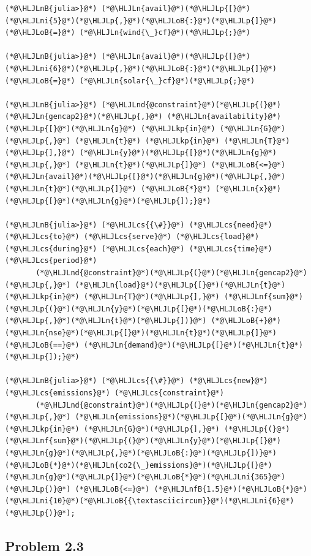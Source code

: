 \documentclass[12pt,a4paper]{article}
\newcommand{\HLJLkp}[1]{\textcolor[RGB]{148,91,176}{\textbf{#1}}}
\newcommand{\HLJLn}[1]{#1}
\newcommand{\HLJLnd}[1]{\textcolor[RGB]{214,102,97}{#1}}
\newcommand{\HLJLnf}[1]{\textcolor[RGB]{66,102,213}{#1}}
\newcommand{\HLJLnB}[1]{\textcolor[RGB]{59,151,46}{#1}}
\newcommand{\HLJLnfB}[1]{\textcolor[RGB]{59,151,46}{#1}}
\newcommand{\HLJLni}[1]{\textcolor[RGB]{59,151,46}{#1}}
\newcommand{\HLJLoB}[1]{\textcolor[RGB]{102,102,102}{\textbf{#1}}}
\newcommand{\HLJLp}[1]{#1}
\newcommand{\HLJLcs}[1]{\textcolor[RGB]{153,153,119}{\textit{#1}}}
\begin{document}
\begin{lstlisting}
(*@\HLJLnB{julia>}@*) (*@\HLJLn{avail}@*)(*@\HLJLp{[}@*)(*@\HLJLni{5}@*)(*@\HLJLp{,}@*)(*@\HLJLoB{:}@*)(*@\HLJLp{]}@*) (*@\HLJLoB{=}@*) (*@\HLJLn{wind{\_}cf}@*)(*@\HLJLp{;}@*)

(*@\HLJLnB{julia>}@*) (*@\HLJLn{avail}@*)(*@\HLJLp{[}@*)(*@\HLJLni{6}@*)(*@\HLJLp{,}@*)(*@\HLJLoB{:}@*)(*@\HLJLp{]}@*) (*@\HLJLoB{=}@*) (*@\HLJLn{solar{\_}cf}@*)(*@\HLJLp{;}@*)

(*@\HLJLnB{julia>}@*) (*@\HLJLnd{@constraint}@*)(*@\HLJLp{(}@*)(*@\HLJLn{gencap2}@*)(*@\HLJLp{,}@*) (*@\HLJLn{availability}@*)(*@\HLJLp{[}@*)(*@\HLJLn{g}@*) (*@\HLJLkp{in}@*) (*@\HLJLn{G}@*)(*@\HLJLp{,}@*) (*@\HLJLn{t}@*) (*@\HLJLkp{in}@*) (*@\HLJLn{T}@*)(*@\HLJLp{],}@*) (*@\HLJLn{y}@*)(*@\HLJLp{[}@*)(*@\HLJLn{g}@*)(*@\HLJLp{,}@*) (*@\HLJLn{t}@*)(*@\HLJLp{]}@*) (*@\HLJLoB{<=}@*) (*@\HLJLn{avail}@*)(*@\HLJLp{[}@*)(*@\HLJLn{g}@*)(*@\HLJLp{,}@*) (*@\HLJLn{t}@*)(*@\HLJLp{]}@*) (*@\HLJLoB{*}@*) (*@\HLJLn{x}@*)(*@\HLJLp{[}@*)(*@\HLJLn{g}@*)(*@\HLJLp{]);}@*)

(*@\HLJLnB{julia>}@*) (*@\HLJLcs{{\#}}@*) (*@\HLJLcs{need}@*) (*@\HLJLcs{to}@*) (*@\HLJLcs{serve}@*) (*@\HLJLcs{load}@*) (*@\HLJLcs{during}@*) (*@\HLJLcs{each}@*) (*@\HLJLcs{time}@*) (*@\HLJLcs{period}@*)
       (*@\HLJLnd{@constraint}@*)(*@\HLJLp{(}@*)(*@\HLJLn{gencap2}@*)(*@\HLJLp{,}@*) (*@\HLJLn{load}@*)(*@\HLJLp{[}@*)(*@\HLJLn{t}@*) (*@\HLJLkp{in}@*) (*@\HLJLn{T}@*)(*@\HLJLp{],}@*) (*@\HLJLnf{sum}@*)(*@\HLJLp{(}@*)(*@\HLJLn{y}@*)(*@\HLJLp{[}@*)(*@\HLJLoB{:}@*)(*@\HLJLp{,}@*)(*@\HLJLn{t}@*)(*@\HLJLp{])}@*) (*@\HLJLoB{+}@*) (*@\HLJLn{nse}@*)(*@\HLJLp{[}@*)(*@\HLJLn{t}@*)(*@\HLJLp{]}@*) (*@\HLJLoB{==}@*) (*@\HLJLn{demand}@*)(*@\HLJLp{[}@*)(*@\HLJLn{t}@*)(*@\HLJLp{]);}@*)

(*@\HLJLnB{julia>}@*) (*@\HLJLcs{{\#}}@*) (*@\HLJLcs{new}@*) (*@\HLJLcs{emissions}@*) (*@\HLJLcs{constraint}@*)
       (*@\HLJLnd{@constraint}@*)(*@\HLJLp{(}@*)(*@\HLJLn{gencap2}@*)(*@\HLJLp{,}@*) (*@\HLJLn{emissions}@*)(*@\HLJLp{[}@*)(*@\HLJLn{g}@*) (*@\HLJLkp{in}@*) (*@\HLJLn{G}@*)(*@\HLJLp{],}@*) (*@\HLJLp{(}@*)(*@\HLJLnf{sum}@*)(*@\HLJLp{(}@*)(*@\HLJLn{y}@*)(*@\HLJLp{[}@*)(*@\HLJLn{g}@*)(*@\HLJLp{,}@*)(*@\HLJLoB{:}@*)(*@\HLJLp{])}@*)(*@\HLJLoB{*}@*)(*@\HLJLn{co2{\_}emissions}@*)(*@\HLJLp{[}@*)(*@\HLJLn{g}@*)(*@\HLJLp{]}@*)(*@\HLJLoB{*}@*)(*@\HLJLni{365}@*)(*@\HLJLp{)}@*) (*@\HLJLoB{<=}@*) (*@\HLJLnfB{1.5}@*)(*@\HLJLoB{*}@*)(*@\HLJLni{10}@*)(*@\HLJLoB{{\textasciicircum}}@*)(*@\HLJLni{6}@*)(*@\HLJLp{)}@*);
\end{lstlisting}

\subsection{Problem 2.3}
\end{document}
